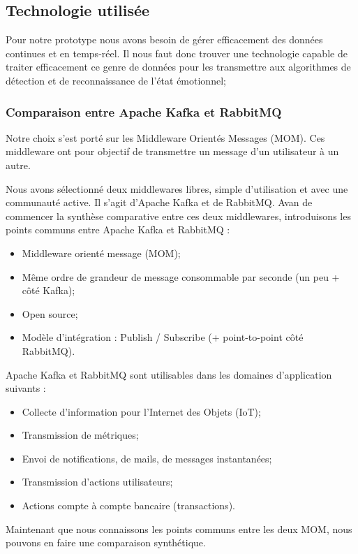 \documentclass{article}
\begin{document}
	\subsection{Technologie utilisée}\label{sec:prototech}
		Pour notre prototype nous avons besoin de gérer efficacement des données continues et en temps-réel.
		Il nous faut donc trouver une technologie capable de traiter efficacement ce genre de données pour les transmettre aux algorithmes de détection et de reconnaissance de l'état émotionnel;
		\subsubsection{Comparaison entre Apache Kafka et RabbitMQ}\label{sec:comparatif}
			Notre choix s'est porté sur les Middleware Orientés Messages (MOM).
			Ces middleware ont pour objectif de transmettre un message d'un utilisateur à un autre.\par
			Nous avons sélectionné deux middlewares libres, simple d'utilisation et avec une communauté active.
			Il s'agit d'Apache Kafka et de RabbitMQ.
			Avan de commencer la synthèse comparative entre ces deux middlewares,  introduisons les points communs entre Apache Kafka et RabbitMQ :
			\begin{itemize}
				\item Middleware orienté message (MOM);
				\item Même ordre de grandeur de message consommable par seconde (un peu + côté Kafka);
				\item Open source;
				\item Modèle d’intégration : Publish / Subscribe (+ point-to-point côté RabbitMQ).
			\end{itemize}
			Apache Kafka et RabbitMQ sont utilisables dans les domaines d'application suivants :
			\begin{itemize}
				\item Collecte d’information pour l'Internet des Objets (IoT);
				\item Transmission de métriques;
				\item Envoi de notifications, de mails, de messages instantanées;
				\item Transmission d’actions utilisateurs;
				\item Actions compte à compte bancaire (transactions).
			\end{itemize}\par
			Maintenant que nous connaissons les points communs entre les deux MOM, nous pouvons en faire une comparaison synthétique.\par
\end{document}
